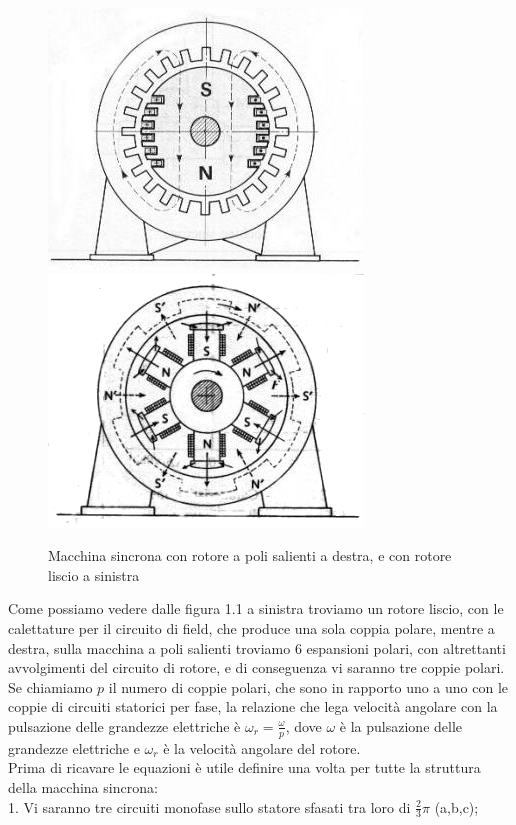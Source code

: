 \documentclass[Lau,noexaminfo]{sapthesis}
\begin{document}
	\begin{figure}
		\centering
		\includegraphics[scale=0.55]{poli_lisci1}
		\includegraphics[scale=0.55]{poli_salienti1}
		\caption{Macchina sincrona con rotore a poli salienti a destra, e con rotore liscio a sinistra}
	\end{figure}
	Come possiamo vedere dalle figura 1.1 a sinistra troviamo un rotore liscio, con le calettature per il circuito di field, che produce una sola coppia polare, mentre a destra, sulla macchina a poli salienti troviamo 6 espansioni polari, con altrettanti avvolgimenti del circuito di rotore, e di conseguenza vi saranno tre coppie polari. Se chiamiamo $p$ il numero di coppie polari, che sono in rapporto uno a uno con le coppie di circuiti statorici per fase, la relazione che lega velocità angolare con la pulsazione delle grandezze elettriche è $\omega_r = \frac{\omega}{p}$, dove $\omega$ è la pulsazione delle grandezze elettriche e $\omega_r$ è la velocità angolare del rotore.\\
	Prima di ricavare le equazioni è utile definire una volta per tutte la struttura della macchina sincrona:\\
	1. Vi saranno tre circuiti monofase sullo statore sfasati tra loro di $\frac{2}{3}\pi$ (a,b,c);\\
\end{document}
